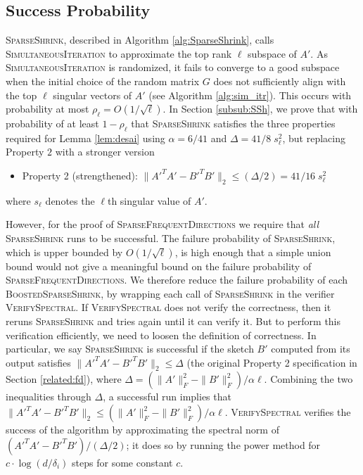 \documentclass[11pt]{article}
\newcommand{\sfd}{\textsc{SparseFrequentDirections}\xspace}
\newcommand{\si}{\textsc{SimultaneousIteration}\xspace}
\newcommand{\SSh}{\textsc{SparseShrink}\xspace}
\newcommand{\BSSh}{\textsc{BoostedSparseShrink}\xspace}
\newcommand{\vs}{\textsc{VerifySpectral}\xspace}
\begin{document}
\subsection{Success Probability}
\label{sec:suc-prob}
\SSh, described in Algorithm \ref{alg:SparseShrink}, calls \si to approximate the top rank $\ell$ subspace of $A'$.
As \si is randomized, it fails to converge to a good subspace when the initial choice of the random matrix $G$ does not sufficiently align with the top $\ell$ singular vectors of $A'$ (see Algorithm \ref{alg:sim_itr}). This occurs with probability at most $\rho_\ell = O(1/\sqrt{\ell})$.
In Section \ref{subsub:SSh}, we prove that with probability of at least $1-\rho_\ell$ that \SSh satisfies the three properties required for Lemma \ref{lem:desai} using $\alpha = 6/41$ and $\Delta = 41/8\; s_\ell^2$, but replacing Property $2$ with a stronger version
\begin{itemize}
\item Property 2 (strengthened):  
$\|A'^TA' - B'^T B'\|_2 \leq (\Delta/2) = 41/16\; s_\ell^2$
\end{itemize}
where $s_\ell$ denotes the $\ell$th singular value of $A'$.




However, for the proof of \sfd we require that {\it all} \SSh runs to be successful. 
The failure probability of \SSh, which is upper bounded by $O(1/\sqrt \ell)$, is high enough that a simple union bound would not give a meaningful bound on the failure probability of \sfd. We therefore reduce the failure probability of each \BSSh, by wrapping each call of \SSh in the verifier \vs.  If \vs does not verify the correctness, then it reruns \SSh and tries again until it can verify it.   
But to perform this verification efficiently, we need to loosen the definition of correctness.  In particular, we say \SSh is successful if the sketch $B'$ computed from its output satisfies $\|A'^T A' - B'^T B'\|_2 \leq \Delta$ (the original Property 2 specification in Section \ref{related:fd}), where $\Delta = (\|A'\|_F^2 - \|B'\|_F^2) / \alpha \ell$.  Combining the two inequalities through $\Delta$, a successful run implies that $\|A'^T A' - B'^TB'\|_2 \leq (\|A'\|_F^2 - \|B'\|_F^2) / \alpha \ell$.  
\vs verifies the success of the algorithm by approximating the spectral norm of $(A'^T A' - B'^T B')/(\Delta/2)$; it does so by running the power method for $c \cdot \log(d/\delta_i)$ steps for some constant $c$.  
\end{document}
